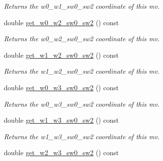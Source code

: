 \begin{DoxyCompactItemize}
\begin{DoxyCompactList}\small\item\em Returns the w0\-\_\-w1\-\_\-sw0\-\_\-sw2 coordinate of this mv. \end{DoxyCompactList}\item 
\hypertarget{classe3ga_1_1mv_a3f1258c9812067741fcc6eb9b2d77dc5}{double \hyperlink{classe3ga_1_1mv_a3f1258c9812067741fcc6eb9b2d77dc5}{get\-\_\-w0\-\_\-w2\-\_\-sw0\-\_\-sw2} () const }\label{classe3ga_1_1mv_a3f1258c9812067741fcc6eb9b2d77dc5}

\begin{DoxyCompactList}\small\item\em Returns the w0\-\_\-w2\-\_\-sw0\-\_\-sw2 coordinate of this mv. \end{DoxyCompactList}\item 
\hypertarget{classe3ga_1_1mv_a02fbec0b1dca7e39778cfe816e75cf8a}{double \hyperlink{classe3ga_1_1mv_a02fbec0b1dca7e39778cfe816e75cf8a}{get\-\_\-w1\-\_\-w2\-\_\-sw0\-\_\-sw2} () const }\label{classe3ga_1_1mv_a02fbec0b1dca7e39778cfe816e75cf8a}

\begin{DoxyCompactList}\small\item\em Returns the w1\-\_\-w2\-\_\-sw0\-\_\-sw2 coordinate of this mv. \end{DoxyCompactList}\item 
\hypertarget{classe3ga_1_1mv_a91ff44782941ab43d03c8721f27bf5c2}{double \hyperlink{classe3ga_1_1mv_a91ff44782941ab43d03c8721f27bf5c2}{get\-\_\-w0\-\_\-w3\-\_\-sw0\-\_\-sw2} () const }\label{classe3ga_1_1mv_a91ff44782941ab43d03c8721f27bf5c2}

\begin{DoxyCompactList}\small\item\em Returns the w0\-\_\-w3\-\_\-sw0\-\_\-sw2 coordinate of this mv. \end{DoxyCompactList}\item 
\hypertarget{classe3ga_1_1mv_a3457afcd211aabf3e7a60a0cf00935f6}{double \hyperlink{classe3ga_1_1mv_a3457afcd211aabf3e7a60a0cf00935f6}{get\-\_\-w1\-\_\-w3\-\_\-sw0\-\_\-sw2} () const }\label{classe3ga_1_1mv_a3457afcd211aabf3e7a60a0cf00935f6}

\begin{DoxyCompactList}\small\item\em Returns the w1\-\_\-w3\-\_\-sw0\-\_\-sw2 coordinate of this mv. \end{DoxyCompactList}\item 
\hypertarget{classe3ga_1_1mv_a9bdf79e2a9809b3bc2e59c712660d35e}{double \hyperlink{classe3ga_1_1mv_a9bdf79e2a9809b3bc2e59c712660d35e}{get\-\_\-w2\-\_\-w3\-\_\-sw0\-\_\-sw2} () const }\label{classe3ga_1_1mv_a9bdf79e2a9809b3bc2e59c712660d35e}


\end{DoxyCompactItemize}
